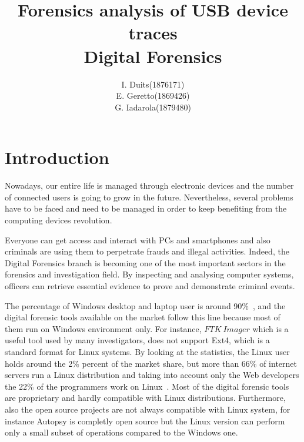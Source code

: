 \documentclass[a4paper]{article}
\title{Forensics analysis of USB device traces\\
\large Digital Forensics}
\author{
\begin{tabular}{>{\raggedleft}m{5cm}m{5cm}}
I. Duits & (1876171) \\
E. Geretto & (1869426) \\
G. Iadarola & (1879480) \\
\end{tabular}
}
\begin{document}
\maketitle


\section{Introduction}
Nowadays, our entire life is managed through electronic devices and the number of
connected users is going to grow in the future. Nevertheless, several
problems have to be faced and need to be managed in order to keep benefiting
from the computing devices revolution.

Everyone can get access and interact with PCs and smartphones and also criminals
are using them to perpetrate frauds and illegal activities. Indeed, the Digital
Forensics branch is becoming one of the most important sectors in the forensics
and investigation field. By inspecting and analysing computer systems, officers
can retrieve essential evidence to prove and demonstrate criminal events.

The percentage of Windows desktop and laptop user is around 90\%~\cite{usagePC},
and the digital forensic tools available on the market follow this line because
most of them run on Windows environment only. For instance, $FTK~Imager$ which
is a useful tool used by many investigators, does not support Ext4, which is a
standard format for Linux systems. By looking at the statistics, the Linux user
holds around the 2\% percent of the market share, but more than 66\% of internet
servers run a Linux distribution and taking into account only the Web developers
the 22\% of the programmers work on Linux~\cite{usagePC}. Most of the digital
forensic tools are proprietary and hardly compatible with Linux distributions.
Furthermore, also the open source projects are not always compatible with Linux
system, for instance Autopsy is completly open source but the Linux version can
perform only a small subset of operations compared to the Windows one.
\end{document}
